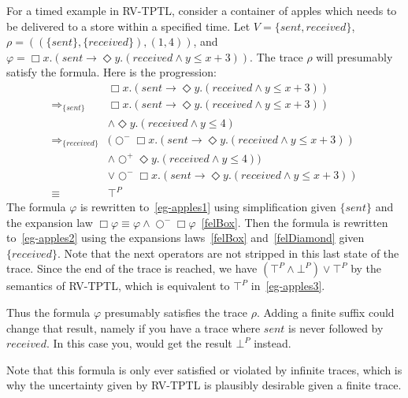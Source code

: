 \documentclass[a4paper]{article}
\newcommand{\sn}{\bigcirc^+}
\newcommand{\wn}{\bigcirc^-}
\newcommand{\rw}[1]{\Rightarrow_{#1}}
\begin{document}
\begin{eg}[Apples]

  For a timed example in RV-TPTL, consider a container of apples which needs to be delivered to a store within a specified time.
  Let $V=\{sent, received\}$,
  \(\rho=((\{sent\},\{received\}),(1,4))\),
  and \(\varphi=\Box x. (sent \to \Diamond y. (received \land y \leq x + 3))\).
  The trace $\rho$ will presumably satisfy the formula.
  Here is the progression:
  \begin{align}
    &\Box x. (sent \to \Diamond y. (received \land y \leq x + 3))\nonumber\\
    \rw{\{sent\}}
    &\Box x. (sent \to \Diamond y. (received \land y \leq x + 3))\nonumber\\
    &\land \Diamond y. (received \land y \leq 4)
    \label{eg-apples1}\\
    \rw{\{received\}}
    &(\wn \Box x. (sent \to \Diamond y. (received \land y \leq x + 3))\nonumber\\
    &\land \sn \Diamond y. (received \land y \leq 4))\nonumber\\
    &\lor \wn \Box x. (sent \to \Diamond y. (received \land y \leq x + 3))\label{eg-apples2}\\
    \equiv
    &\top^P\label{eg-apples3}
  \end{align}
  The formula $\varphi$ is rewritten to~\eqref{eg-apples1} using simplification given $\{sent\}$ and the expansion law $\Box \varphi \equiv \varphi \land \wn \Box \varphi$~\eqref{felBox}.
  Then the formula is rewritten to~\eqref{eg-apples2} using the expansions laws~\eqref{felBox} and~\eqref{felDiamond} given $\{received\}$.
  Note that the next operators are not stripped in this last state of the trace.
  Since the end of the trace is reached, we have $(\top^P \land \bot^P) \lor \top^P$ by the semantics of RV-TPTL, which is equivalent to $\top^P$ in~\eqref{eg-apples3}.

  Thus the formula $\varphi$ presumably satisfies the trace $\rho$.
  Adding a finite suffix could change that result, namely if you have a trace where $sent$ is never followed by $received$.
  In this case you, would get the result $\bot^P$ instead.

  Note that this formula is only ever satisfied or violated by infinite traces, which is why the uncertainty given by RV-TPTL is plausibly desirable given a finite trace.
\end{eg}

\end{document}
